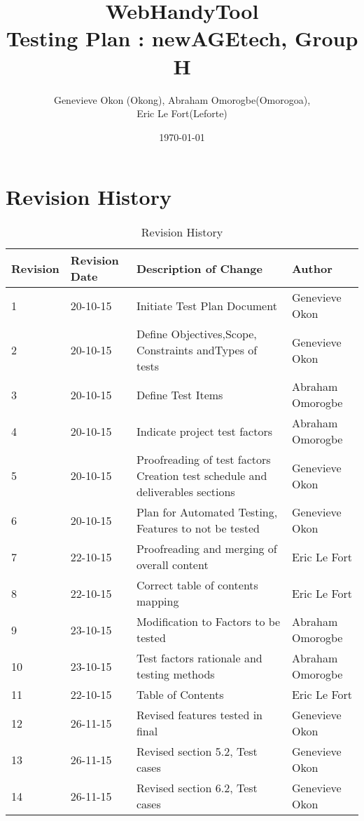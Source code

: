 \documentclass[12pt, titlepage]{article}
\begin{document}
\title{WebHandyTool \\
 Testing Plan : newAGEtech, Group H }
\author{Genevieve Okon (Okong), Abraham Omorogbe(Omorogoa),\\
 Eric Le Fort(Leforte)}
\date{\today}
\maketitle
\pagebreak


\tableofcontents

\pagebreak
\listoffigures
\listoftables
\pagebreak


\section{Revision History}
\begin{table}[h!]
	\begin{tabular}{| p{5cm} | p{5cm} | p{5cm} |p{5cm} |}    \hline
Revision  &Revision Date &Description of Change &Author\\ \hline
1& 20-10-15& Initiate Test Plan Document&Genevieve Okon\\ \hline
2& 20-10-15& Define Objectives,Scope, Constraints andTypes of tests&Genevieve Okon\\ \hline
3& 20-10-15& Define Test Items&Abraham Omorogbe\\ \hline
4& 20-10-15& Indicate project test factors&Abraham Omorogbe\\ \hline
5& 20-10-15&Proofreading of test factors Creation test schedule and deliverables sections&Genevieve Okon\\ \hline
6& 20-10-15&Plan for Automated Testing, Features to not be tested&Genevieve Okon\\ \hline
7& 22-10-15& Proofreading and merging of overall content&Eric Le Fort\\ \hline
8& 22-10-15& Correct table of contents mapping&Eric Le Fort\\ \hline
9& 23-10-15& Modification to Factors to be tested&Abraham Omorogbe\\ \hline
10& 23-10-15& Test factors rationale and testing methods&Abraham Omorogbe\\ \hline
11& 22-10-15& Table of Contents&Eric Le Fort\\ \hline

12& 26-11-15& Revised features tested in final&Genevieve Okon\\ \hline
13& 26-11-15& Revised section 5.2, Test cases&Genevieve Okon\\ \hline
14& 26-11-15& Revised section 6.2, Test cases&Genevieve Okon\\ \hline
       \end{tabular}
       
       \caption{Revision History}
       \label{table:Revision History}
\end{table}
\end{document}

